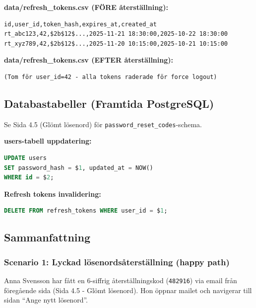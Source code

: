 \documentclass[12pt,a4paper]{article}
\begin{document}
\textbf{data/refresh\_tokens.csv (FÖRE återställning):}
\begin{verbatim}
id,user_id,token_hash,expires_at,created_at
rt_abc123,42,$2b$12$...,2025-11-21 18:30:00,2025-10-22 18:30:00
rt_xyz789,42,$2b$12$...,2025-11-20 10:15:00,2025-10-21 10:15:00
\end{verbatim}

\textbf{data/refresh\_tokens.csv (EFTER återställning):}
\begin{verbatim}
(Tom för user_id=42 - alla tokens raderade för force logout)
\end{verbatim}

\subsection{Databastabeller (Framtida PostgreSQL)}

Se Sida 4.5 (Glömt lösenord) för \texttt{password\_reset\_codes}-schema.

\textbf{users-tabell uppdatering:}
\begin{lstlisting}[language=sql]
UPDATE users 
SET password_hash = $1, updated_at = NOW() 
WHERE id = $2;
\end{lstlisting}

\textbf{Refresh tokens invalidering:}
\begin{lstlisting}[language=sql]
DELETE FROM refresh_tokens WHERE user_id = $1;
\end{lstlisting}

\subsection{Sammanfattning}

\subsubsection{Scenario 1: Lyckad lösenordsåterställning (happy path)}

Anna Svensson har fått en 6-siffrig återställningskod (\texttt{482916}) via email från föregående sida (Sida 4.5 - Glömt lösenord). Hon öppnar mailet och navigerar till sidan ``Ange nytt lösenord''.
\end{document}
